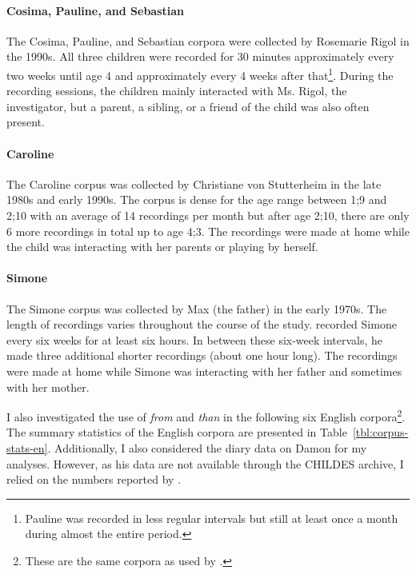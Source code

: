 \documentclass[lucida]{sp} %
\begin{document}
\paragraph{Cosima, Pauline, and Sebastian}
The Cosima, Pauline, and Sebastian corpora were collected by Rosemarie Rigol in the 1990s. All three children were recorded for 30 minutes approximately every two weeks until age 4 and approximately every 4 weeks after that\footnote{Pauline was recorded in less regular intervals but still at least once a month during almost the entire period.}. During the recording sessions, the children mainly interacted with Ms. Rigol, the investigator, but a parent, a sibling, or a friend of the child was also often present.

\paragraph{Caroline}
The Caroline corpus was collected by Christiane von Stutterheim in the late 1980s and early 1990s. The corpus is dense for the age range between 1;9 and 2;10 with an average of 14 recordings per month but after age 2;10, there are only 6 more recordings in total up to age 4;3. The recordings were made at home while the child was interacting with her parents or playing by herself.

\paragraph{Simone}
The Simone corpus was collected by Max \cite{miller1979} (the father) in the early 1970s. The length of recordings varies  throughout the course of the study. \cite{miller1979} recorded Simone every six weeks for at least six hours. In between these six-week intervals, he made three additional shorter recordings (about one hour long). The recordings were made at home while Simone was interacting with her father and sometimes with her mother.


\vspace{1em}



I also investigated the use of \textit{from} and \textit{than} in the following six English corpora\footnote{These are the same corpora as used by \cite{clark1989a}.}. 
  The summary statistics of the English corpora are presented in Table~\ref{tbl:corpus-stats-en}. Additionally, I also considered the diary data on Damon for my analyses. However, as his data are not available through the CHILDES archive, I relied on the numbers reported by \cite{clark1989a}.
\end{document}
